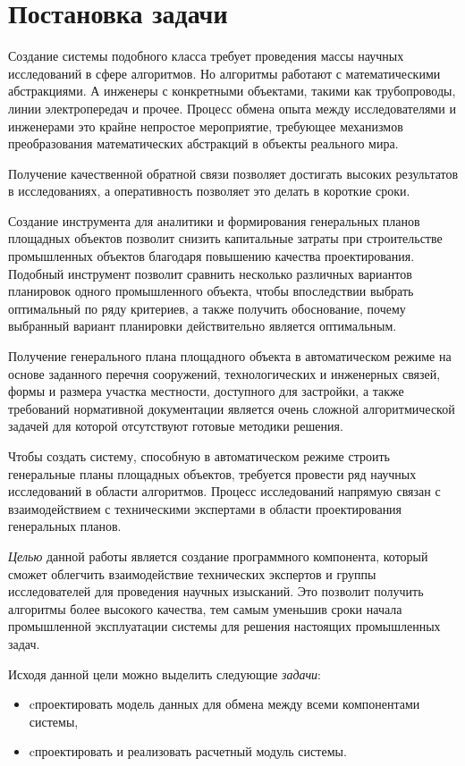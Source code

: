 \section*{\Large{Постановка задачи}}





Создание системы подобного класса требует проведения массы научных исследований в сфере алгоритмов.
Но алгоритмы работают с математическими абстракциями.
А инженеры с конкретными объектами, такими как трубопроводы, линии электропередач и прочее.
Процесс обмена опыта между исследователями и инженерами это крайне непростое мероприятие,
требующее механизмов преобразования математических абстракций в объекты реального мира.

Получение качественной обратной связи позволяет достигать высоких результатов в исследованиях, а оперативность
позволяет это делать в короткие сроки.


Создание инструмента для аналитики и формирования генеральных планов площадных объектов позволит снизить
капитальные затраты при строительстве промышленных объектов благодаря повышению качества проектирования.
Подобный инструмент позволит сравнить несколько различных вариантов планировок одного промышленного объекта,
чтобы впоследствии выбрать оптимальный по ряду критериев, а также получить обоснование,
почему выбранный вариант планировки действительно является оптимальным.

Получение генерального плана площадного объекта в автоматическом режиме на основе
заданного перечня сооружений, технологических и инженерных связей,
формы и размера участка местности, доступного для застройки, а также требований нормативной документации является очень
сложной алгоритмической задачей для которой отсутствуют готовые методики решения.

Чтобы создать систему, способную в автоматическом режиме строить генеральные планы площадных объектов,
требуется провести ряд научных исследований в области алгоритмов.
Процесс исследований напрямую связан с взаимодействием с техническими экспертами
в области проектирования генеральных планов.

\textit{Целью} данной работы является создание программного компонента,
который сможет облегчить взаимодействие технических экспертов
и группы исследователей для проведения научных изысканий.
Это позволит получить алгоритмы более высокого качества,
тем самым уменьшив сроки начала промышленной эксплуатации системы
для решения настоящих промышленных задач.

Исходя данной цели можно выделить следующие \textit{задачи}:
\begin{itemize}
    \item cпроектировать модель данных для обмена между всеми компонентами системы,
    \item cпроектировать и реализовать расчетный модуль системы.
\end{itemize}
